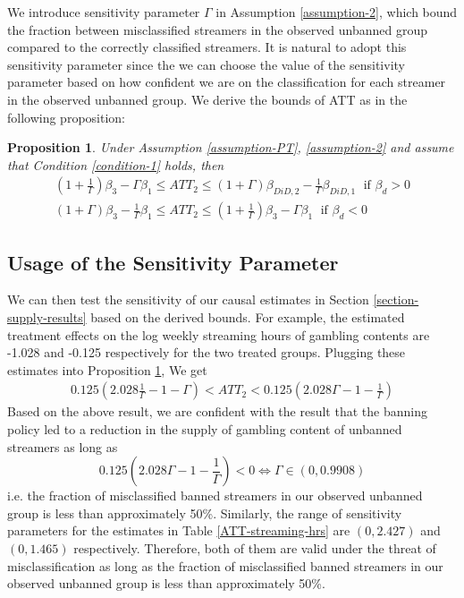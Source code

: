 \documentclass[a4paper,12pt]{article}
\newtheorem{proposition}{Proposition}
\begin{document}
We introduce sensitivity parameter $\Gamma$ in Assumption \ref{assumption-2}, which bound the fraction between misclassified streamers in the observed unbanned group compared to the correctly classified streamers. It is natural to adopt this sensitivity parameter since the we can choose the value of the sensitivity parameter based on how confident we are on the classification for each streamer in the observed unbanned group. We derive the bounds of ATT as in the following proposition:
\begin{proposition}\label{prop-3}
    Under Assumption \ref{assumption-PT}, \ref{assumption-2} and assume that Condition \ref{condition-1} holds, then
    \begin{align*}
        (1+\frac{1}{\Gamma})\beta_{3} - \Gamma \beta_{1} \leq ATT_2 \leq (1+\Gamma)\beta_{DiD,2} - \frac{1}{\Gamma} \beta_{DiD,1}\; \text{ if }\beta_{d} > 0\\
        (1+\Gamma)\beta_{3} - \frac{1}{\Gamma} \beta_{1} \leq ATT_2 \leq (1+\frac{1}{\Gamma})\beta_{3} - \Gamma \beta_{1}\; \text{ if }\beta_{d} < 0
    \end{align*}
\end{proposition}

\clearpage
\subsection{Usage of the Sensitivity Parameter}

We can then test the sensitivity of our causal estimates in Section \ref{section-supply-results} based on the derived bounds. For example, the estimated treatment effects on the log weekly streaming hours of gambling contents are -1.028 and -0.125 respectively for the two treated groups. Plugging these estimates into Proposition \ref{prop-3}, We get
\begin{align*}
    0.125(2.028\frac{1}{\Gamma}-1-\Gamma) < ATT_2 < 0.125(2.028\Gamma-1-\frac{1}{\Gamma})
\end{align*}
Based on the above result, we are confident with the result that the banning policy led to a reduction in the supply of gambling content of unbanned streamers as long as
\begin{equation*}
    0.125(2.028\Gamma-1-\frac{1}{\Gamma}) < 0 \Leftrightarrow \Gamma \in (0,0.9908)
\end{equation*}
i.e. the fraction of misclassified banned streamers in our observed unbanned group is less than approximately 50\%. Similarly, the range of sensitivity parameters for the estimates in Table \ref{ATT-streaming-hrs} are $(0, 2.427)$ and $(0, 1.465)$ respectively. Therefore, both of them are valid under the threat of misclassification as long as the fraction of misclassified banned streamers in our observed unbanned group is less than approximately 50\%.
\end{document}
